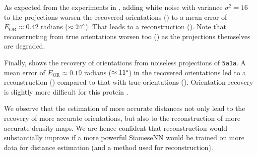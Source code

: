 As expected from the experiments in , adding white noise with variance $\sigma^2=16$ to the projections worsen the recovered orientations () to a mean error of $E_\text{OR} \approx 0.42$ radians ($\approx 24\degree$).
That leads to a  reconstruction ().
Note that reconstructing from true orientations worsen too  () as the projections themselves are degraded.

Finally,  shows the recovery of orientations from noiseless projections of \texttt{5a1a}.
A mean error of $E_\text{OR} \approx 0.19$ radians ($\approx 11\degree$) in the recovered orientations led to a  reconstruction () compared to that with true orientations ().
Orientation recovery is slightly more difficult for this protein  .

We observe that the estimation of more accurate distances not only lead to the recovery of more accurate orientations, but also to the reconstruction of more accurate density maps.
We are hence confident that reconstruction would substantially improve if a more powerful SiameseNN would be trained on more data for distance estimation (and a   method used for reconstruction).
